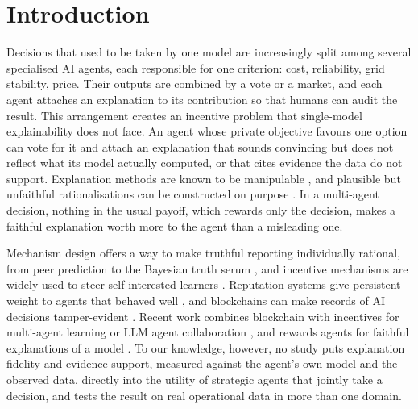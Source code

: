 \documentclass[pdflatex,sn-basic]{sn-jnl}
\begin{document}
\section{Introduction}\label{sec:intro}

Decisions that used to be taken by one model are increasingly split among several
specialised AI agents, each responsible for one criterion: cost, reliability, grid
stability, price. Their outputs are combined by a vote or a market, and each agent attaches
an explanation to its contribution so that humans can audit the result. This arrangement
creates an incentive problem that single-model explainability does not face. An agent whose
private objective favours one option can vote for it and attach an explanation that sounds
convincing but does not reflect what its model actually computed, or that cites evidence the
data do not support. Explanation methods are known to be manipulable
\citep{slack2020,dombrowski2019,heo2019}, and plausible but unfaithful rationalisations can be
constructed on purpose \citep{aivodji2019}. In a multi-agent decision, nothing in the usual
payoff, which rewards only the decision, makes a faithful explanation worth more to the agent
than a misleading one.

Mechanism design offers a way to make truthful reporting individually rational, from peer
prediction \citep{miller2005} to the Bayesian truth serum \citep{prelec2004}, and incentive
mechanisms are widely used to steer self-interested learners \citep{zhan2021}. Reputation
systems give persistent weight to agents that behaved well \citep{josang2007,kamvar2003}, and
blockchains can make records of AI decisions tamper-evident \citep{liang2017,nassar2019}.
Recent work combines blockchain with incentives for multi-agent learning \citep{tian2025} or
LLM agent collaboration \citep{kumala2026}, and rewards agents for faithful explanations of a
model \citep{cheng2026}. To our knowledge, however, no study puts explanation fidelity and
evidence support, measured against the agent's own model and the observed data, directly into
the utility of strategic agents that jointly take a decision, and tests the result on real
operational data in more than one domain.
\end{document}
